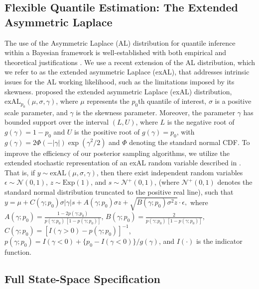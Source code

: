 \documentclass[APA,STIX1COL]{WileyNJD-v2}
\begin{document}
\subsection{Flexible Quantile Estimation: The Extended Asymmetric Laplace}
\label{subsec:exal}

The use of the Asymmetric Laplace (AL) distribution for quantile inference within a Bayesian framework is well-established with both empirical and theoretical justifications \citep{yu2001bayesian, sriram2013theoretical}. We use a recent extension of the AL distribution, which we refer to as the extended asymmetric Laplace (exAL), that addresses intrinsic issues for the AL working likelihood, such as the limitations imposed by its skewness. \citet{yan2025new} proposed the extended asymmetric Laplace (exAL) distribution, $\text{exAL}_{p_0}(\mu, \sigma, \gamma)$, where $\mu$ represents the $p_0$th quantile of interest, $\sigma$ is a positive scale parameter, and $\gamma$ is the skewness parameter. Moreover, the parameter $\gamma$ has bounded support over the interval $(L, U)$, where $L$ is the negative root of $g(\gamma) = 1 - p_0$ and $U$ is the positive root of $g(\gamma) = p_0$, with $g(\gamma) = 2 \Phi(-|\gamma|) \exp(\gamma^2 / 2)$ and $\Phi$ denoting the standard normal CDF. To improve the efficiency of our posterior sampling algorithms, we utilize the extended stochastic representation of an exAL random variable described in \citet{yan2025new}. That is, if $y \sim \text{exAL}(\mu, \sigma, \gamma)$, then there exist independent random variables $\epsilon \sim \mathcal{N}(0, 1)$, $z \sim \text{Exp}(1)$, and $s \sim \mathcal{N}^+(0, 1)$, (where $\mathcal{N}^+(0, 1)$ denotes the standard normal distribution truncated to the positive real line), such that  \( y = \mu + C(\gamma; p_0)\sigma |\gamma| s + A(\gamma; p_0) \sigma z + \sqrt{B(\gamma; p_0) \sigma^2 z} \cdot \epsilon, \) where $A(\gamma; p_0) = \frac{1 - 2 p(\gamma; p_0)}{p(\gamma; p_0) \, [1 - p(\gamma; p_0)]}$, $B(\gamma; p_0) = \frac{2}{p(\gamma; p_0) \, [1 - p(\gamma; p_0)]}$, $C(\gamma; p_0) = [I(\gamma > 0) - p(\gamma; p_0)]^{-1}$, $p(\gamma; p_0) = I(\gamma < 0) + \{p_0 - I(\gamma < 0)\} / g(\gamma)$, and $I(\cdot)$ is the indicator function.


\subsection{Full State-Space Specification}
\label{subsec:fullstatespace}
\end{document}
